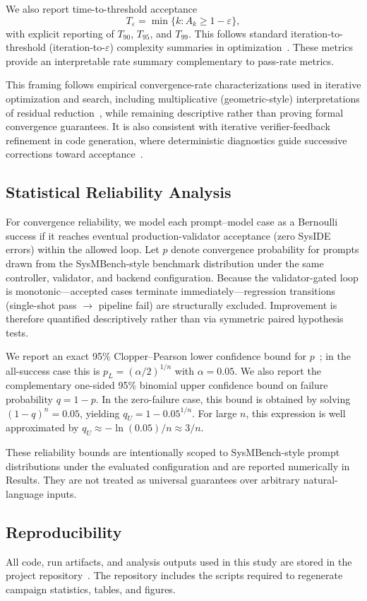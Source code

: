 We also report time-to-threshold acceptance
\[
T_{\varepsilon} = \min\{k : A_k \ge 1-\varepsilon\},
\]
with explicit reporting of $T_{90}$, $T_{95}$, and $T_{99}$. This follows standard iteration-to-threshold (iteration-to-$\varepsilon$) complexity summaries in optimization~\cite{polyak1987introductionOptimization}. These metrics provide an interpretable rate summary complementary to pass-rate metrics.

This framing follows empirical convergence-rate characterizations used in iterative optimization and search, including multiplicative (geometric-style) interpretations of residual reduction~\cite{he2016averageConvergenceRate}, while remaining descriptive rather than proving formal convergence guarantees. It is also consistent with iterative verifier-feedback refinement in code generation, where deterministic diagnostics guide successive corrections toward acceptance~\cite{wang2022compilable,grubisic2024compiler}.

\subsection{Statistical Reliability Analysis}
For convergence reliability, we model each prompt--model case as a Bernoulli success if it reaches eventual production-validator acceptance (zero SysIDE errors) within the allowed loop. Let $p$ denote convergence probability for prompts drawn from the SysMBench-style benchmark distribution under the same controller, validator, and backend configuration. Because the validator-gated loop is monotonic---accepted cases terminate immediately---regression transitions (single-shot pass $\rightarrow$ pipeline fail) are structurally excluded. Improvement is therefore quantified descriptively rather than via symmetric paired hypothesis tests.

We report an exact 95\% Clopper--Pearson lower confidence bound for $p$~\cite{clopper1934confidenceLimits}; in the all-success case this is $p_L=(\alpha/2)^{1/n}$ with $\alpha=0.05$. We also report the complementary one-sided 95\% binomial upper confidence bound on failure probability $q=1-p$. In the zero-failure case, this bound is obtained by solving $(1-q)^n=0.05$, yielding $q_U=1-0.05^{1/n}$. For large $n$, this expression is well approximated by $q_U\approx-\ln(0.05)/n\approx 3/n$.

These reliability bounds are intentionally scoped to SysMBench-style prompt distributions under the evaluated configuration and are reported numerically in Results. They are not treated as universal guarantees over arbitrary natural-language inputs.

\subsection{Reproducibility}
All code, run artifacts, and analysis outputs used in this study are stored in the project repository~\cite{sysmbenchCompilerLoopRepo2026}. The repository includes the scripts required to regenerate campaign statistics, tables, and figures.
